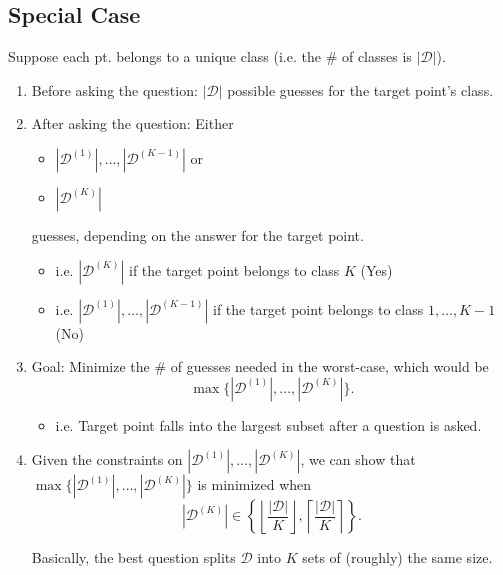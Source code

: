 \subsection{Special Case}
\begin{notes}
    Suppose each pt. belongs to a unique class (i.e. the \# of classes is $|\mathcal{D}|$).
    \begin{enumerate}
    \item Before asking the question: \( |\mathcal{D}| \) possible guesses for the target point’s class.
    \item After asking the question: Either 
    \begin{itemize}
        \item \( |\mathcal{D}^{(1)}|, \dots, |\mathcal{D}^{(K-1)}| \) or 
        \item \( |\mathcal{D}^{(K)}| \) 
    \end{itemize}
    guesses, depending on the answer for the target point.
    \begin{itemize}
        \item i.e. $|\mathcal{D}^{(K)}|$ if the target point belongs to class $K$ (Yes)
        \item i.e. $|\mathcal{D}^{(1)}|, \ldots, |\mathcal{D}^{(K-1)}|$ if the target point belongs to class $1, \ldots, K-1$ (No)
    \end{itemize}

    \item Goal: Minimize the \# of guesses needed in the worst-case, which would be 
    \[
    \max \{ |\mathcal{D}^{(1)}|, \dots, |\mathcal{D}^{(K)}| \}.
    \]
    \begin{itemize}
        \item i.e. Target point falls into the largest subset after a question is asked.
    \end{itemize}

    \item Given the constraints on \( |\mathcal{D}^{(1)}|, \dots, |\mathcal{D}^{(K)}| \), we can show that $\max \{ |\mathcal{D}^{(1)}|, \dots, |\mathcal{D}^{(K)}| \}$ is minimized when
    \[
    |\mathcal{D}^{(K)}| \in \left\{ \left\lfloor \frac{|\mathcal{D}|}{K} \right\rfloor, \left\lceil \frac{|\mathcal{D}|}{K} \right\rceil \right\}.
    \]

    Basically, the best question splits \( \mathcal{D} \) into \( K \) sets of (roughly) the same size.
    \end{enumerate}
\end{notes}

